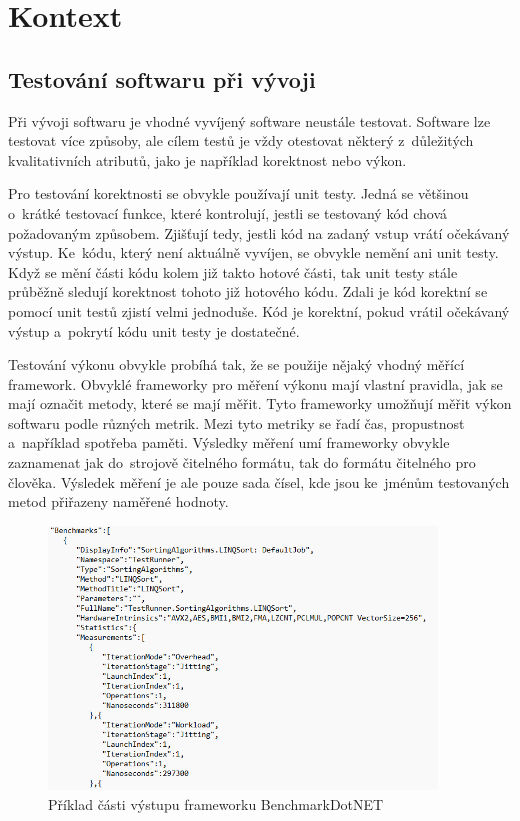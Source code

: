 \chapter{Kontext}

\section{Testování softwaru při vývoji}
Při vývoji softwaru je vhodné vyvíjený software neustále testovat. Software lze testovat
více způsoby, ale cílem testů je vždy otestovat některý z~důležitých kvalitativních
atributů, jako je například korektnost nebo výkon.

Pro testování korektnosti se obvykle používají unit testy. Jedná se většinou o~krátké testovací
funkce, které kontrolují, jestli se testovaný kód chová požadovaným způsobem. Zjišťují tedy, jestli
kód na zadaný vstup vrátí očekávaný výstup. Ke~kódu, který není aktuálně vyvíjen, se obvykle nemění
ani unit testy. Když se mění části kódu kolem již takto hotové části, tak unit testy stále průběžně sledují
korektnost tohoto již hotového kódu. Zdali je kód korektní se pomocí unit testů zjistí velmi jednoduše.
Kód je korektní, pokud vrátil očekávaný výstup a~pokrytí kódu unit testy je dostatečné.

Testování výkonu obvykle probíhá tak, že se použije nějaký vhodný měřící framework.
Obvyklé frameworky pro měření výkonu mají vlastní pravidla, jak se mají označit metody, které
se mají měřit. Tyto frameworky umožňují měřit výkon softwaru podle různých metrik. Mezi tyto metriky
se řadí čas, propustnost a~například spotřeba paměti. Výsledky měření umí frameworky obvykle zaznamenat jak do~strojově
čitelného formátu, tak do formátu čitelného pro člověka. Výsledek měření je ale pouze sada čísel, kde
jsou ke~jménům testovaných metod přiřazeny naměřené hodnoty.

\begin{figure}[!ht]
    \centering
    \includegraphics[width=0.92\textwidth]{../img/BenchmarkDotNET-json.png}
    \caption{Příklad části výstupu frameworku BenchmarkDotNET}
\end{figure}


